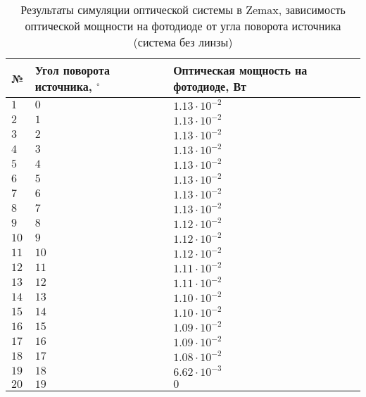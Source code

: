 \begin{table}
    \caption{Результаты симуляции оптической системы в Zemax, зависимость оптической мощности на фотодиоде от угла поворота источника (система без линзы)}
    \label{tab:spinner_no_lens}
    \begin{tabularx}{\textwidth} {
        | l
        | >{\centering\arraybackslash}X
        | >{\centering\arraybackslash}X | }
        \hline
            № & Угол поворота источника, ${}^\circ$ & Оптическая мощность на фотодиоде, Вт \\ \hline
            $1$ & $0$ & $1.13 \cdot 10^{-2}$ \\ \hline
            $2$ & $1$ & $1.13 \cdot 10^{-2}$ \\ \hline
            $3$ & $2$ & $1.13 \cdot 10^{-2}$ \\ \hline
            $4$ & $3$ & $1.13 \cdot 10^{-2}$ \\ \hline
            $5$ & $4$ & $1.13 \cdot 10^{-2}$ \\ \hline
            $6$ & $5$ & $1.13 \cdot 10^{-2}$ \\ \hline
            $7$ & $6$ & $1.13 \cdot 10^{-2}$ \\ \hline
            $8$ & $7$ & $1.13 \cdot 10^{-2}$ \\ \hline
            $9$ & $8$ & $1.12 \cdot 10^{-2}$ \\ \hline
            $10$ & $9$ & $1.12 \cdot 10^{-2}$ \\ \hline
            $11$ & $10$ & $1.12 \cdot 10^{-2}$ \\ \hline
            $12$ & $11$ & $1.11 \cdot 10^{-2}$ \\ \hline
            $13$ & $12$ & $1.11 \cdot 10^{-2}$ \\ \hline
            $14$ & $13$ & $1.10 \cdot 10^{-2}$ \\ \hline
            $15$ & $14$ & $1.10 \cdot 10^{-2}$ \\ \hline
            $16$ & $15$ & $1.09 \cdot 10^{-2}$ \\ \hline
            $17$ & $16$ & $1.09 \cdot 10^{-2}$ \\ \hline
            $18$ & $17$ & $1.08 \cdot 10^{-2}$ \\ \hline
            $19$ & $18$ & $6.62 \cdot 10^{-3}$ \\ \hline
            $20$ & $19$ & $0$ \\ \hline
    \end{tabularx}
\end{table}